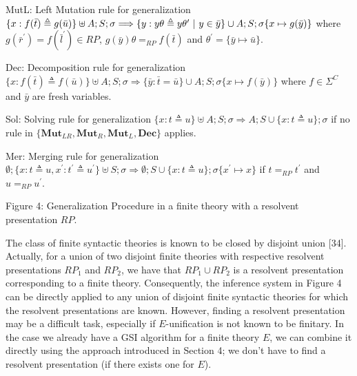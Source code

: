 \documentclass[10pt,a4paper]{amsart}
\begin{document}
\par
 
MutL: Left Mutation rule for generalization  $\{x:f(\bar{t})\triangleq g(\bar{u})\}\uplus A;S;\sigma\Longrightarrow\{y:y\theta\triangleq y\theta^{\prime}\leavevmode\nobreak\ |\leavevmode\nobreak\ y\in\bar{y}\}\cup A;S;\sigma\{x\mapsto g(\bar{y})\}$ where $g(\bar{r}^{\prime})=f(\bar{l}^{\prime})\in RP$, $g(\bar{y})\theta=_{RP}f(\bar{t})$ and $\theta^{\prime}=\{\bar{y}\mapsto\bar{u}\}$.\par
      
\par
 
Dec: Decomposition rule for generalization  $\{x:f(\bar{t})\triangleq f(\bar{u})\}\uplus A;S;\sigma\Longrightarrow\{\bar{y}:\bar{t}=\bar{u}\}\cup A;S;\sigma\{x\mapsto f(\bar{y})\}$ where $f\in{\Sigma}^{C}$ and $\bar{y}$ are fresh variables.\par
     
\par
 
Sol: Solving rule for generalization  $\{x:t\triangleq u\}\uplus A;S;\sigma\Longrightarrow A;S\cup\{x:t\triangleq u\};\sigma$ if no rule in $\{\mathbf{Mut}_{LR},\mathbf{Mut}_{R},\mathbf{Mut}_{L},\mathbf{Dec}\}$ applies.\par
      
\par
 
Mer: Merging rule for generalization  $\emptyset;\{x:t\triangleq u,x^{\prime}:t^{\prime}\triangleq u^{\prime}\}\uplus
S;\sigma\Longrightarrow\emptyset;S\cup\{x:t\triangleq u\};\sigma\{x^{\prime}\mapsto x\}$ if $t=_{RP}t^{\prime}$ and $u=_{RP}u^{\prime}$.\par
    
Figure 4: Generalization Procedure in a finite theory with a resolvent presentation $RP$.\par
 
 
 
The class of finite syntactic theories is known to be closed by disjoint union [34]. Actually, for a union of two disjoint finite theories with respective resolvent presentations $RP_{1}$ and $RP_{2}$, we have that $RP_{1}\cup RP_{2}$ is a resolvent presentation corresponding to a finite theory. Consequently, the inference system in Figure 4 can be directly applied to any union of disjoint finite syntactic theories for which the resolvent presentations are known. However, finding a resolvent presentation may be a difficult task, especially if $E$-unification is not known to be finitary. In the case we already have a GSI algorithm for a finite theory $E$, we can combine it directly using the approach introduced in Section 4; we don’t have to find a resolvent presentation (if there exists one for $E$).\par
 
\end{document}
